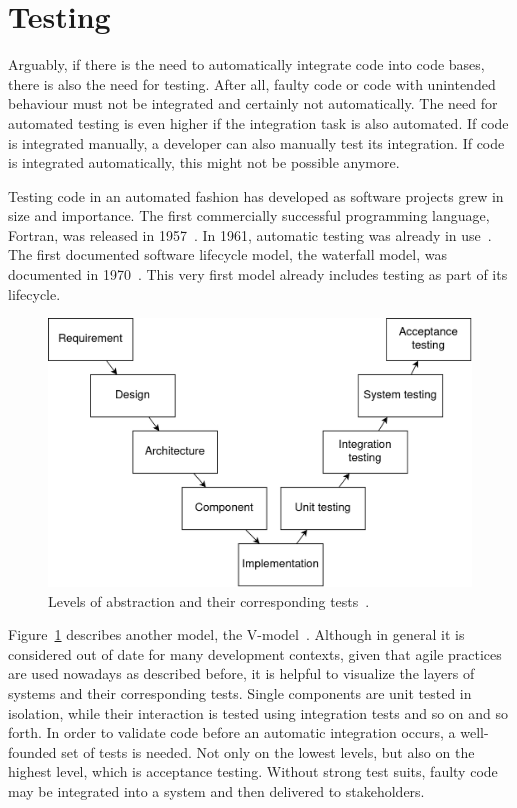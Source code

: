 \section{Testing}\label{sec:testing}

Arguably, if there is the need to automatically integrate code into code bases, there is also the need for testing.
After all, faulty code or code with unintended behaviour must not be integrated and certainly not automatically.
The need for automated testing is even higher if the integration task is also automated.
If code is integrated manually, a developer can also manually test its integration.
If code is integrated automatically, this might not be possible anymore.

Testing code in an automated fashion has developed as software projects grew in size and importance.
The first commercially successful programming language, Fortran, was released in 1957~\cite{history-of-software}.
In 1961, automatic testing was already in use~\cite{automatic-grading-of-graphical-user-interface-programs}.
The first documented software lifecycle model, the waterfall model, was documented in 1970~\cite{history-of-waterfall-model}.
This very first model already includes testing as part of its lifecycle.

\begin{figure}[h]
    \centering
    \includegraphics[width=0.5\textheight]{img/introduction/software-testing-v.drawio}
    \caption{Levels of abstraction and their corresponding tests~\cite{waterfall-vs-v-model-vs-agile}.}
    \label{fig:levels-of-abstraction-and-tests}
\end{figure}

Figure~\ref{fig:levels-of-abstraction-and-tests} describes another model, the V-model~\cite{waterfall-vs-v-model-vs-agile}.
Although in general it is considered out of date for many development contexts, given that agile practices are used nowadays as described before, it is helpful to visualize the layers of systems and their corresponding tests.
Single components are unit tested in isolation, while their interaction is tested using integration tests and so on and so forth.
In order to validate code before an automatic integration occurs, a well-founded set of tests is needed.
Not only on the lowest levels, but also on the highest level, which is acceptance testing.
Without strong test suits, faulty code may be integrated into a system and then delivered to stakeholders.

